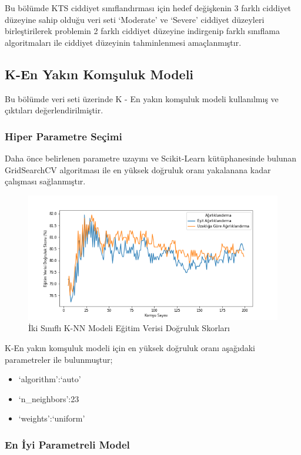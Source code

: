 \documentclass[12pt,twoside]{deuthesis}
\providecommand{\tightlist}{%
  \setlength{\itemsep}{0pt}\setlength{\parskip}{0pt}}
\begin{document}
Bu bölümde KTS ciddiyet sınıflandırması için hedef değişkenin 3 farklı ciddiyet düzeyine sahip olduğu veri seti `Moderate' ve `Severe' ciddiyet düzeyleri birleştirilerek problemin 2 farklı ciddiyet düzeyine indirgenip farklı sınıflama algoritmaları ile ciddiyet düzeyinin tahminlenmesi amaçlanmıştır.

\hypertarget{bin_knn}{%
\subsection{K-En Yakın Komşuluk Modeli}\label{bin_knn}}

Bu bölümde veri seti üzerinde K - En yakın komşuluk modeli kullanılmış ve çıktıları değerlendirilmiştir.

\hypertarget{hiper-parametre-seuxe7imi-4}{%
\subsubsection{Hiper Parametre Seçimi}\label{hiper-parametre-seuxe7imi-4}}

Daha önce belirlenen parametre uzayını ve Scikit-Learn kütüphanesinde bulunan GridSearchCV algoritması ile en yüksek doğruluk oranı yakalanana kadar çalışması sağlanmıştır.
\begin{figure}

{\centering \includegraphics[width=1.1\linewidth,height=0.55\textheight]{figure/KNN_bin_Grid_Graph} 

}

\caption{İki Sınıflı K-NN Modeli Eğitim Verisi Doğruluk Skorları}\label{fig:unnamed-chunk-54}
\end{figure}
\newpage

K-En yakın komşuluk modeli için en yüksek doğruluk oranı aşağıdaki parametreler ile bulunmuştur;
\begin{itemize}
\tightlist
\item
  `algorithm':`auto'\\
\item
  `n\_neighbors':23\\
\item
  `weights':`uniform'
\end{itemize}
\hypertarget{en-iyi-parametreli-model-2}{%
\subsubsection{En İyi Parametreli Model}\label{en-iyi-parametreli-model-2}}
\end{document}
